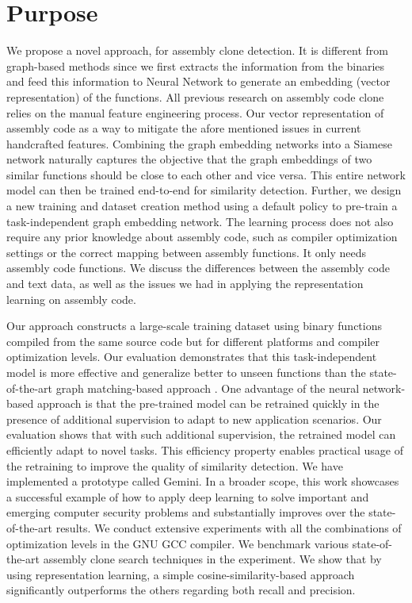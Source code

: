 \section{Purpose}

We propose a novel approach, for assembly clone detection. It is different from graph-based methods since we first extracts the information from the binaries and feed this information to Neural Network to generate an embedding (vector representation) of the functions. All previous research on assembly code clone relies on the manual feature engineering process. Our vector representation of assembly code as a way to mitigate the afore mentioned issues in current handcrafted features. Combining the graph embedding networks into a Siamese network \cite{Bromley} naturally captures the objective that the graph embeddings of two similar functions should be close to each other and vice versa. This entire network model can then be trained end-to-end for similarity detection. Further, we design a new training and dataset creation method using a default policy to pre-train a task-independent graph embedding network. The learning process does not also require any prior knowledge about assembly code, such as compiler optimization settings or the correct mapping between assembly functions. It only needs assembly code functions. We discuss the differences between the assembly code and text data, as well as the issues we had in applying the representation learning on assembly code.

Our approach constructs a large-scale training dataset using binary functions compiled from the same source code but for different platforms and compiler optimization levels. Our evaluation demonstrates that this task-independent model is more effective and generalize better to unseen functions than the state-of-the-art graph matching-based approach \cite{Dullien}. One advantage of the neural network-based approach is that the pre-trained model can be retrained quickly in the presence of additional supervision to adapt to new application scenarios. Our evaluation shows that with such additional supervision, the retrained model can efficiently adapt to novel tasks. This efficiency property enables practical usage of the retraining to improve the quality of similarity detection. We have implemented a prototype called Gemini. In a broader scope, this work showcases a successful example of how to apply deep learning to solve important and emerging computer security problems and substantially improves over the
state-of-the-art results. We conduct extensive experiments with all the combinations of optimization levels in the GNU GCC compiler. We benchmark various state-of-the-art assembly clone search techniques in the experiment. We show that by using representation learning, a simple cosine-similarity-based approach significantly outperforms the others regarding both recall and precision.

